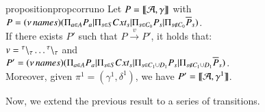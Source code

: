 \begin{restatable}[Correctness 1]{proposition}{propcorruno}
 \label{prop:corr1}
 Let 
 $P=\llbracket{\cal A},\gamma\rrbracket$ with\\
$P  = (\nu\, names) (\Pi_{a \in A}P_a| \Pi_{s \in S}Cxt_s | \Pi_{s \in C_0}P_s| \Pi_{s \notin C_0}\overline{P}_s)$.\\
 If there exists  $P'$  such that $P \xrightarrow{v}P'$,  it holds that:\\
  $v={}^{\tau} \backslash_{\tau}\dots{}^{\tau} \backslash_{\tau}$ and \\
 $P'= (\nu\, names) (\Pi_{a \in A}P_a| \Pi_{s \in S}Cxt_s | \Pi_{s \in C_1 \cup D_1}P_s| \Pi_{s \notin C_1 \cup D_1}\overline{P}_s)$.\\
Moreover, given $\pi^1=(\gamma^1,\delta^1)$, we have $P' = \llbracket {\cal A},\gamma^1\rrbracket$.
\end{restatable}
 

 
 
\noindent
Now, we extend the previous result to a series of transitions.
 
